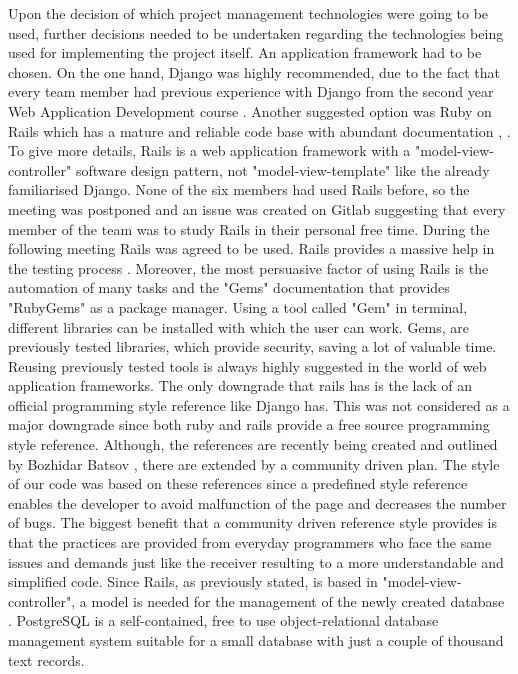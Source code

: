 \documentclass{l3proj}
\begin{document}
Upon the decision of which project management technologies were going to be used, further decisions needed to be undertaken regarding the technologies being used for implementing the project itself. An application framework had to be chosen. On the one hand, Django was highly recommended, due to the fact that every team member had previous experience with Django from the second year Web Application Development course \cite{Django}. Another suggested option was Ruby on Rails which has a mature and reliable code base with abundant documentation \cite{Rails}, \cite{DjangoVsRails}. To give more details, Rails is a web application framework with a "model-view-controller" software design pattern, not "model-view-template" like the already familiarised Django. None of the six members had used Rails before, so the meeting was postponed and an issue was created on Gitlab suggesting that every member of the team was to study Rails in their personal free time. During the following meeting Rails was agreed to be used. Rails provides a massive help in the testing process \cite{RubyGem} . Moreover, the most persuasive factor of using Rails is the automation of many tasks and the "Gems" documentation that provides "RubyGems" as a package manager. Using a tool called "Gem" in terminal, different libraries can be installed with which the user can work. Gems, are previously tested libraries, which provide security, saving a lot of valuable time. Reusing previously tested tools is always highly suggested in the world of web application frameworks. The only downgrade that rails has is the lack of an official programming style reference like Django has. This was not considered as a major downgrade since both ruby \cite{rubyStyle} and rails \cite{railsStyle} provide a free source programming style reference. Although, the references are recently being created and outlined by Bozhidar Batsov \cite{batsov}, there are extended by a community driven plan. The style of our code was based on these references since a predefined style reference enables the developer to avoid malfunction of the page and decreases the number of bugs. The biggest benefit that a community driven reference style provides is that the practices are provided from everyday programmers who face the same issues and demands just like the receiver resulting to a more understandable and simplified code. Since Rails, as previously stated, is based in "model-view-controller", a model is needed for the management of the newly created database \cite{PostgreSQL}. PostgreSQL is a self-contained, free to use object-relational database management system suitable for a small database with just a couple of thousand text records.
\end{document}
